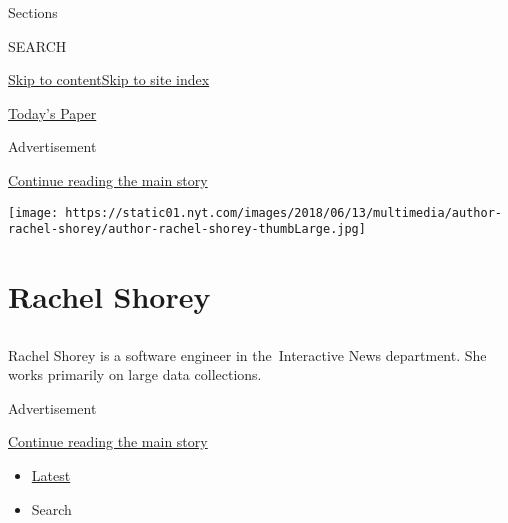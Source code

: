 Sections

SEARCH

\protect\hyperlink{site-content}{Skip to
content}\protect\hyperlink{site-index}{Skip to site index}

\href{https://myaccount.nytimes.com/auth/login?response_type=cookie\&client_id=vi}{}

\href{https://www.nytimes.com/section/todayspaper}{Today's Paper}

Advertisement

\protect\hyperlink{after-top}{Continue reading the main story}

\texttt{[image: https://static01.nyt.com/images/2018/06/13/multimedia/author-rachel-shorey/author-rachel-shorey-thumbLarge.jpg]}

\hypertarget{rachel-shorey}{%
\section{Rachel Shorey}\label{rachel-shorey}}

\subsection{}

Rachel Shorey is a software engineer in the~Interactive News department.
She works primarily on large data collections.

Advertisement

\protect\hyperlink{after-mid1}{Continue reading the main story}

\begin{itemize}
\tightlist
\item
  \protect\hyperlink{stream-panel}{Latest}
\item
  Search
\end{itemize}

